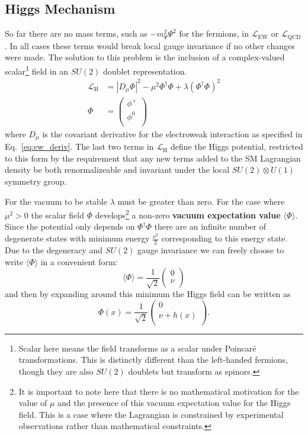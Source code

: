 \subsection{Higgs Mechanism}
So far there are no mass terms, such as $-m_\Psi^2 \Psi^2$ for the fermions, in $\mathcal{L}_{\mathrm{EW}}$ or $\mathcal{L}_{\mathrm{QCD}}$.
In all cases these terms would break local gauge invariance if no other changes were made.
The solution to this problem is the inclusion of a complex-valued scalar\footnote{Scalar here means the field transforms as a scalar under Poincar\'{e} transformations. This is distinctly different than the left-handed fermions, though they are also $SU(2)$ doublets but transform as spinors.} field in an $SU(2)$ doublet representation.
\begin{align}
    \mathcal{L}_{\mathrm{H}} &= \left|D_\mu \Phi\right|^2 - \mu^2 \Phi^\dag \Phi + \lambda \left(\Phi^\dag \Phi \right)^2 \\
    \Phi &= 
    \begin{pmatrix}
    \phi^+ \\
    \phi^0 \\
    \end{pmatrix}
\end{align}
where $D_\mu$ is the covariant derivative for the electroweak interaction as specified in Eq.~\ref{eq:ew_deriv}.
The last two terms in $\mathcal{L}_{\mathrm{H}}$ define the Higgs potential, restricted to this form by the requirement that any new terms added to the SM Lagrangian density be both renormalizeable and invariant under the local $SU(2) \otimes U(1)$ symmetry group.

For the vacuum to be stable $\lambda$ must be greater than zero. For the case where $\mu^2 > 0$ the scalar field $\Phi$ develops\footnote{It is important to note here that there is no mathematical motivation for the value of $\mu$ and the presence of this vacuum expectation value for the Higgs field. This is a case where the Lagrangian is constrained by experimental observations rather than mathematical constraints.} a non-zero \textbf{vacuum expectation value} $\langle \Phi \rangle$.
Since the potential only depends on $\Phi^\dag \Phi$ there are an infinite number of degenerate states with minimum energy $\frac{\nu^2}{2}$ corresponding to this energy state.
Due to the degeneracy and $SU(2)$ gauge invariance we can freely choose to write $\langle \Phi \rangle$ in a convenient form:
\begin{equation}
\langle \Phi \rangle = \frac{1}{\sqrt{2}} 
    \begin{pmatrix}
    0 \\
    \nu \\
    \end{pmatrix}
\end{equation}
and then by expanding around this minimum the Higgs field can be written as
\begin{equation}
\Phi(x) = \frac{1}{\sqrt{2}} 
    \begin{pmatrix}
    0 \\
    \nu  + h(x) \\
    \end{pmatrix}.
\end{equation}

